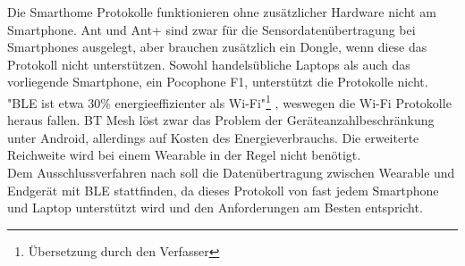 Die Smarthome Protokolle funktionieren ohne zusätzlicher Hardware nicht am Smartphone.
Ant und Ant+ sind zwar für die Sensordatenübertragung bei Smartphones ausgelegt, aber brauchen zusätzlich ein Dongle, wenn diese das Protokoll nicht unterstützen.
Sowohl handelsübliche Laptops als auch das vorliegende Smartphone, ein Pocophone F1, unterstützt die Protokolle nicht.\\
"BLE ist etwa 30\% energieeffizienter als Wi-Fi"\footnote{Übersetzung durch den Verfasser} \cite{comparison_wifi_ble}, weswegen die Wi-Fi Protokolle heraus fallen.
BT Mesh löst zwar das Problem der Geräteanzahlbeschränkung unter Android, allerdings auf Kosten des Energieverbrauchs.
Die erweiterte Reichweite wird bei einem Wearable in der Regel nicht benötigt.\\
Dem Ausschlussverfahren nach soll die Datenübertragung zwischen Wearable und Endgerät mit BLE stattfinden, da dieses Protokoll von fast jedem Smartphone und Laptop unterstützt wird und den Anforderungen am Besten entspricht.

